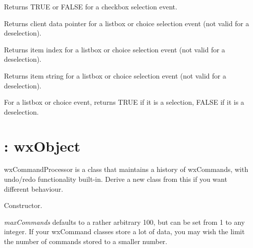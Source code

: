 

Returns TRUE or FALSE for a checkbox selection event.



Returns client data pointer for a listbox or choice selection event
(not valid for a deselection).



Returns item index for a listbox or choice selection event (not valid for
a deselection).



Returns item string for a listbox or choice selection event (not valid for
a deselection).



For a listbox or choice event, returns TRUE if it is a selection, FALSE if it
is a deselection.



\section{: wxObject}\label{wxcommandprocessor}


wxCommandProcessor is a class that maintains a history of wxCommands,
with undo/redo functionality built-in. Derive a new class from this
if you want different behaviour.



Constructor.

{\it maxCommands} defaults to a rather arbitrary 100, but can be set from 1 to any integer.
If your wxCommand classes store a lot of data, you may wish the limit the number of
commands stored to a smaller number.


